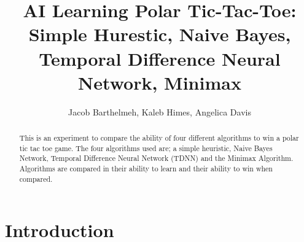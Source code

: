 \documentclass[12pt,letterpaper]{article}
\title{AI Learning Polar Tic-Tac-Toe: \\ Simple Hurestic, Naive Bayes, Temporal Difference Neural Network, Minimax}
\author{Jacob Barthelmeh, Kaleb Himes, Angelica Davis}
\begin{document}
\maketitle

\begin{abstract}
This is an experiment to compare the ability of four different algorithms to win a polar tic tac toe game. The four algorithms used are; a simple heuristic, Naive Bayes Network, Temporal Difference Neural Network (TDNN) and the Minimax Algorithm. Algorithms are compared in their ability to learn and their ability to win when compared.
\end{abstract}

\section{Introduction}
\end{document}
